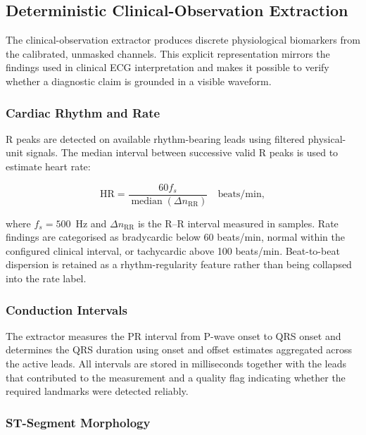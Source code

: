 \documentclass{ssnreview}
\begin{document}
\subsection{Deterministic Clinical-Observation Extraction}

The clinical-observation extractor produces discrete physiological biomarkers from the
calibrated, unmasked channels. This explicit representation mirrors the findings used in
clinical ECG interpretation and makes it possible to verify whether a diagnostic claim is
grounded in a visible waveform.

\subsubsection{Cardiac Rhythm and Rate}

R peaks are detected on available rhythm-bearing leads using filtered physical-unit signals.
The median interval between successive valid R peaks is used to estimate heart rate:

\begin{equation}
  \mathrm{HR}
  =\frac{60f_s}{\operatorname{median}(\Delta n_{\mathrm{RR}})}
  \quad\text{beats/min},
  \label{eq:heart-rate}
\end{equation}

where $f_s=500$~Hz and $\Delta n_{\mathrm{RR}}$ is the R--R interval measured in
samples. Rate findings are categorised as bradycardic below 60 beats/min, normal within
the configured clinical interval, or tachycardic above 100 beats/min. Beat-to-beat
dispersion is retained as a rhythm-regularity feature rather than being collapsed into the
rate label.

\subsubsection{Conduction Intervals}

The extractor measures the PR interval from P-wave onset to QRS onset and determines the
QRS duration using onset and offset estimates aggregated across the active leads. All
intervals are stored in milliseconds together with the leads that contributed to the
measurement and a quality flag indicating whether the required landmarks were detected
reliably.

\subsubsection{ST-Segment Morphology}
\end{document}
